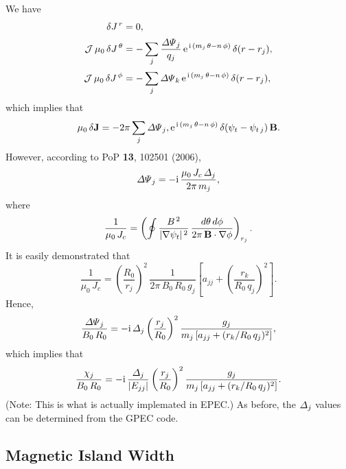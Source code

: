 \documentclass[12pt]{article}
\begin{document}
We have
\begin{align}
\delta J^{\,r} &= 0,\\[0.5ex]
{\cal J}\,\mu_0\,\delta J^{\,\theta} &= -\sum_j \frac{{\mit\Delta\Psi}_j}{q_j}\,{\rm e}^{\,{\rm i}\,(m_j\,\theta-n\,\phi)}\,\delta(r-r_j),\\[0.5ex]
{\cal J}\,\mu_0\,\delta J^{\,\phi} &= -\sum_j {\mit\Delta\Psi}_k\,{\rm e}^{\,{\rm i}\,(m_j\,\theta-n\,\phi)}\,\delta(r-r_j),
\end{align}
which implies that
\begin{equation}
\mu_0\,\delta{\bf J} = -2\pi\sum_j{\mit\Delta\Psi}_j,{\rm e}^{\,{\rm i}\,(m_j\,\theta-n\,\phi)}\,\delta(\psi_t-\psi_{t\,j})\,{\bf B}.
\end{equation}
However, according to PoP {\bf 13}, 102501 (2006),
\begin{equation}
{\mit\Delta\Psi}_j =- {\rm i}\,\frac{\mu_0\,J_c\,{\mit\Delta}_j}{2\pi\,m_j},
\end{equation}
where
\begin{equation}
\frac{1}{\mu_0\,J_c} = \left(\oint \frac{B^{\,2}}{|\nabla\psi_t|^{\,2}}\,\frac{d\theta\,d\phi}{2\pi\,{\bf B}\cdot\nabla\phi}\right)_{r_j}.
\end{equation}
It is easily demonstrated that
\begin{equation}
\frac{1}{\mu_0\,J_c} = \left(\frac{R_0}{r_j}\right)^2\,\frac{1}{2\pi\,B_0\,R_0\,g_j}\left[a_{jj} + \left(\frac{r_k}{R_0\,q_j}\right)^2\right].
\end{equation}
Hence,
\begin{equation}
\frac{{\mit\Delta\Psi}_j}{B_0\,R_0} = -{\rm i}\,{\mit\Delta}_j\left(\frac{r_j}{R_0}\right)^2\frac{g_j}{m_j\,[a_{jj}+ (r_k/R_0\,q_j)^2]},
\end{equation}
which implies that
\begin{equation}
\frac{\chi_j}{B_0\,R_0} = -{\rm i}\,\frac{{\mit\Delta}_j}{|E_{jj}|}\left(\frac{r_j}{R_0}\right)^2\frac{g_j}{m_j\,[a_{jj}+ (r_k/R_0\,q_j)^2]}.
\end{equation}
(Note: This is what is actually implemated in EPEC.)
As before, the ${\mit\Delta}_j$ values can be determined from the GPEC code. 

\subsection{Magnetic Island Width}
\end{document}
